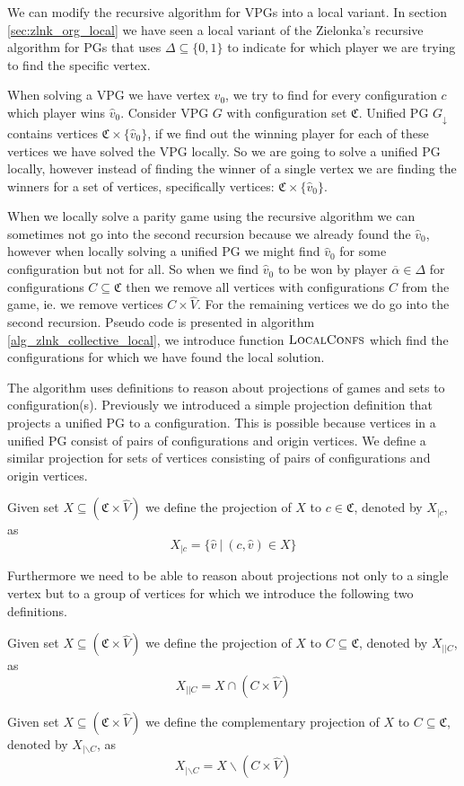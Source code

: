We can modify the recursive algorithm for VPGs into a local variant. In section \ref{sec:zlnk_org_local} we have seen a local variant of the Zielonka's recursive algorithm for PGs that uses $\Delta \subseteq \{0,1\}$ to indicate for which player we are trying to find the specific vertex.

When solving a VPG we have vertex $\hat{v}_0$, we try to find for every configuration $c$ which player wins $\hat{v}_0$. Consider VPG $G$ with configuration set $\mathfrak{C}$. Unified PG $G_{\downarrow}$ contains vertices $\mathfrak{C} \times \{\hat{v}_0\}$, if we find out the winning player for each of these vertices we have solved the VPG locally. So we are going to solve a unified PG locally, however instead of finding the winner of a single vertex we are finding the winners for a set of vertices, specifically vertices: $\mathfrak{C} \times \{\hat{v}_0\}$.

When we locally solve a parity game using the recursive algorithm we can sometimes not go into the second recursion because we already found the $\hat{v}_0$, however when locally solving a unified PG we might find $\hat{v}_0$ for some configuration but not for all. So when we find $\hat{v}_0$ to be won by player $\overline{\alpha} \in \Delta$ for configurations $C \subseteq \mathfrak{C}$ then we remove all vertices with configurations $C$ from the game, ie. we remove vertices $C \times \hat{V}$. For the remaining vertices we do go into the second recursion. Pseudo code is presented in algorithm \ref{alg_zlnk_collective_local}, we introduce function $\textsc{LocalConfs}$ which find the configurations for which we have found the local solution.

The algorithm uses definitions to reason about projections of games and sets to configuration(s). Previously we introduced a simple projection definition that projects a unified PG to a configuration. This is possible because vertices in a unified PG consist of pairs of configurations and origin vertices. We define a similar projection for sets of vertices consisting of pairs of configurations and origin vertices.
\begin{definition}
	Given set $X \subseteq (\mathfrak{C} \times \hat{V})$ we define the projection of $X$ to $c \in \mathfrak{C}$, denoted by $X_{|c}$, as
	\[ X_{|c} = \{ \hat{v}\ |\ (c,\hat{v}) \in X \}\]
\end{definition}
Furthermore we need to be able to reason about projections not only to a single vertex but to a group of vertices for which we introduce the following two definitions.
\begin{definition}
	Given set $X \subseteq (\mathfrak{C} \times \hat{V})$ we define the projection of $X$ to $C \subseteq \mathfrak{C}$, denoted by $X_{||C}$, as
	\[ X_{||C} = X \cap (C \times \hat{V}) \]
\end{definition}
\begin{definition}
Given set $X \subseteq (\mathfrak{C} \times \hat{V})$ we define the complementary projection of $X$ to $C \subseteq \mathfrak{C}$, denoted by $X_{|\backslash C}$, as
\[ X_{|\backslash C} = X \backslash (C \times \hat{V}) \]
\end{definition}

